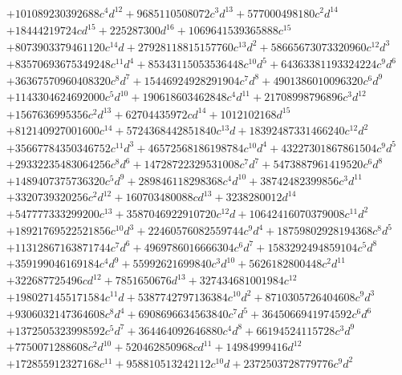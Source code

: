 {\begin{align*}
&+101089230392688c^{4}d^{12}+9685110508072c^{3}d^{13}+577000498180c^{2}d^{14}\\
&+18444219724cd^{15}+225287300d^{16}+1069641539365888c^{15}\\
&+8073903379461120c^{14}d+27928118815157760c^{13}d^{2}+58665673073320960c^{12}d^{3}\\
&+83570693675349248c^{11}d^{4}+85343115053536448c^{10}d^{5}+64363381193324224c^{9}d^{6}\\
&+36367570960408320c^{8}d^{7}+15446924928291904c^{7}d^{8}+4901386010096320c^{6}d^{9}\\
&+1143304624692000c^{5}d^{10}+190618603462848c^{4}d^{11}+21708998796896c^{3}d^{12}\\
&+1567636995356c^{2}d^{13}+62704435972cd^{14}+1012102168d^{15}\\
&+812140927001600c^{14}+5724368442851840c^{13}d+18392487331466240c^{12}d^{2}\\
&+35667784350346752c^{11}d^{3}+46572568186198784c^{10}d^{4}+43227301867861504c^{9}d^{5}\\
&+29332235483064256c^{8}d^{6}+14728722329531008c^{7}d^{7}+5473887961419520c^{6}d^{8}\\
&+1489407375736320c^{5}d^{9}+289846118298368c^{4}d^{10}+38742482399856c^{3}d^{11}\\
&+3320739320256c^{2}d^{12}+160703480088cd^{13}+3238280012d^{14}\\
&+547777333299200c^{13}+3587046922910720c^{12}d+10642416070379008c^{11}d^{2}\\
&+18921769522521856c^{10}d^{3}+22460576082559744c^{9}d^{4}+18759802928194368c^{8}d^{5}\\
&+11312867163871744c^{7}d^{6}+4969786016666304c^{6}d^{7}+1583292494859104c^{5}d^{8}\\
&+359199046169184c^{4}d^{9}+55992621699840c^{3}d^{10}+5626182800448c^{2}d^{11}\\
&+322687725496cd^{12}+7851650676d^{13}+327434681001984c^{12}\\
&+1980271455171584c^{11}d+5387742797136384c^{10}d^{2}+8710305726404608c^{9}d^{3}\\
&+9306032147364608c^{8}d^{4}+6908696634563840c^{7}d^{5}+3645066941974592c^{6}d^{6}\\
&+1372505323998592c^{5}d^{7}+364464092646880c^{4}d^{8}+66194524115728c^{3}d^{9}\\
&+7750071288608c^{2}d^{10}+520462850968cd^{11}+14984999416d^{12}\\
&+172855912327168c^{11}+958810513242112c^{10}d+2372503728779776c^{9}d^{2}\\

\end{align*}}
